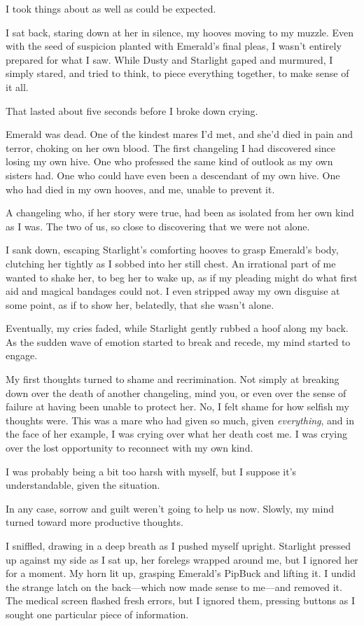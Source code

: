 I took things about as well as could be expected.

I sat back, staring down at her in silence, my hooves moving to my muzzle. Even with the seed of suspicion planted with Emerald’s final pleas, I wasn’t entirely prepared for what I saw. While Dusty and Starlight gaped and murmured, I simply stared, and tried to think, to piece everything together, to make sense of it all.

That lasted about five seconds before I broke down crying.

Emerald was dead. One of the kindest mares I’d met, and she’d died in pain and terror, choking on her own blood. The first changeling I had discovered since losing my own hive. One who professed the same kind of outlook as my own sisters had. One who could have even been a descendant of my own hive. One who had died in my own hooves, and me, unable to prevent it.

A changeling who, if her story were true, had been as isolated from her own kind as I was. The two of us, so close to discovering that we were not alone.

I sank down, escaping Starlight’s comforting hooves to grasp Emerald’s body, clutching her tightly as I sobbed into her still chest. An irrational part of me wanted to shake her, to beg her to wake up, as if my pleading might do what first aid and magical bandages could not. I even stripped away my own disguise at some point, as if to show her, belatedly, that she wasn’t alone.

Eventually, my cries faded, while Starlight gently rubbed a hoof along my back. As the sudden wave of emotion started to break and recede, my mind started to engage.

My first thoughts turned to shame and recrimination. Not simply at breaking down over the death of another changeling, mind you, or even over the sense of failure at having been unable to protect her. No, I felt shame for how selfish my thoughts were. This was a mare who had given so much, given \textit{everything}, and in the face of her example, I was crying over what her death cost me. I was crying over the lost opportunity to reconnect with my own kind.

I was probably being a bit too harsh with myself, but I suppose it’s understandable, given the situation.

In any case, sorrow and guilt weren’t going to help us now. Slowly, my mind turned toward more productive thoughts.

I sniffled, drawing in a deep breath as I pushed myself upright. Starlight pressed up against my side as I sat up, her forelegs wrapped around me, but I ignored her for a moment. My horn lit up, grasping Emerald’s PipBuck and lifting it. I undid the strange latch on the back—which now made sense to me—and removed it. The medical screen flashed fresh errors, but I ignored them, pressing buttons as I sought one particular piece of information.

